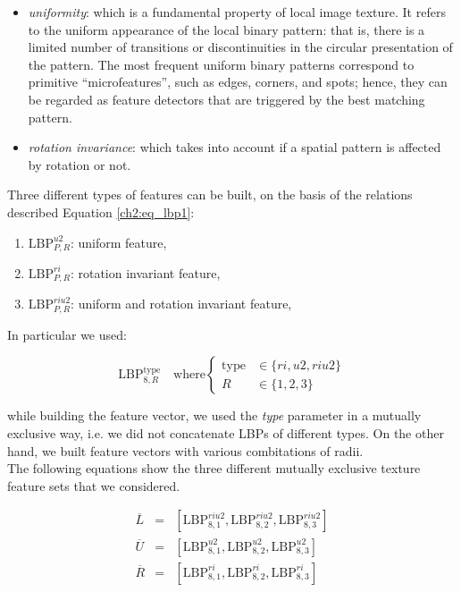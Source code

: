 \begin{itemize}
 \item \textit{uniformity}: which is a fundamental property of local image texture. It refers to the uniform appearance of the local
binary pattern: that is, there is a limited number of transitions or discontinuities in the circular presentation of the pattern.
The most frequent uniform binary patterns correspond to primitive \textquotedblleft microfeatures\textquotedblright, such
as edges, corners, and spots; hence, they can be regarded as feature detectors that are triggered by the best matching
pattern.
\item \textit{rotation invariance}: which takes into account if a spatial pattern is affected by rotation or not.
\end{itemize}

Three different types of features can be built, on the basis of the relations described Equation \ref{ch2:eq_lbp1}:

\begin{enumerate}
 \item $\text{LBP}_{P,R}^{u2}$: uniform feature,
 \item $\text{LBP}_{P,R}^{ri}$: rotation invariant feature,
 \item $\text{LBP}_{P,R}^{riu2}$: uniform and rotation invariant feature,
\end{enumerate}

\noindent In particular we used:

\begin{equation}
 \text{LBP}_{8,R}^{\text{type}} \quad \textrm{where} \begin{cases}
    \text{type}  & \in \{ri, u2, riu2\}\\
    R  & \in \{1,2,3\}
  \end{cases}
\end{equation}

\noindent while building the feature vector, we used the \textit{type} parameter in a mutually exclusive way, i.e. we did not concatenate \Glspl{LBP} of different types. On the other hand, we
built feature vectors with various combitations of radii.\\
The following equations show the three different mutually exclusive texture feature sets that we considered.

\begin{eqnarray}
\label{ch4:tftypes}
 \overline{L} & = & \left[ \text{LBP}_{8,1}^{riu2}, \text{LBP}_{8,2}^{riu2}, \text{LBP}_{8,3}^{riu2} \right] \\
 \overline{U} & = & \left[ \text{LBP}_{8,1}^{u2}, \text{LBP}_{8,2}^{u2}, \text{LBP}_{8,3}^{u2} \right] \\
 \overline{R} & = & \left[ \text{LBP}_{8,1}^{ri}, \text{LBP}_{8,2}^{ri}, \text{LBP}_{8,3}^{ri} \right]
\end{eqnarray}

